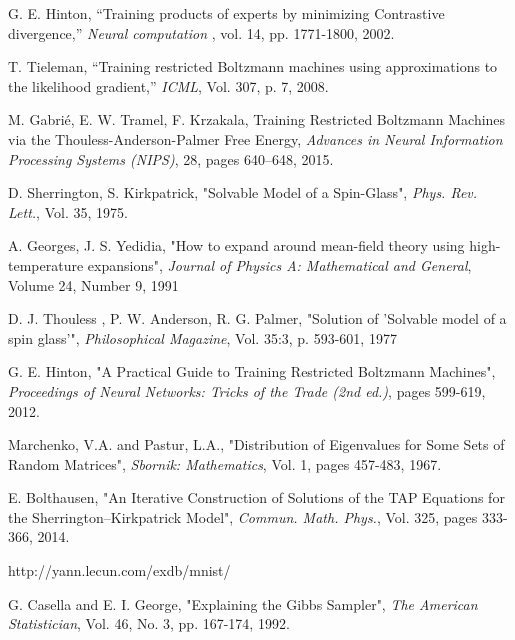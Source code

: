 \begin{thebibliography}{9}

G. E. Hinton, “Training products of experts by minimizing Contrastive divergence,”
\textit{Neural computation}
, vol. 14, pp. 1771-1800, 2002.

T. Tieleman, “Training restricted Boltzmann machines using approximations to the likelihood gradient,”
\textit{ICML}, Vol. 307, p. 7, 2008.

M. Gabrié, E. W. Tramel, F. Krzakala,
Training Restricted Boltzmann Machines via the Thouless-Anderson-Palmer Free Energy,
\textit{Advances in Neural Information Processing Systems (NIPS)}, 28, pages 640--648, 2015.

D. Sherrington, S. Kirkpatrick,
"Solvable Model of a Spin-Glass",
\textit{Phys. Rev. Lett.}, Vol. 35, 1975.

A. Georges, J. S. Yedidia,
"How to expand around mean-field theory using high-temperature expansions",
\textit{Journal of Physics A: Mathematical and General}, Volume 24, Number 9, 1991

D. J. Thouless , P. W. Anderson, R. G. Palmer,
"Solution of 'Solvable model of a spin glass'",
\textit{Philosophical Magazine}, Vol. 35:3, p. 593-601, 1977


G. E. Hinton, "A Practical Guide to Training Restricted Boltzmann Machines", \textit{Proceedings of Neural Networks: Tricks of the Trade (2nd ed.)}, pages 599-619, 2012. 

Marchenko, V.A. and Pastur, L.A., "Distribution of Eigenvalues for Some Sets of Random Matrices", \textit{Sbornik: Mathematics}, Vol. 1, pages 457-483, 1967.

E. Bolthausen, "An Iterative Construction of Solutions of the TAP Equations for the Sherrington–Kirkpatrick Model", \textit{Commun. Math. Phys.}, Vol. 325, pages 333-366, 2014.

http://yann.lecun.com/exdb/mnist/

G. Casella and E. I. George, "Explaining the Gibbs Sampler",
\textit{The American Statistician},
Vol. 46, No. 3, pp. 167-174, 1992.

\end{thebibliography}
